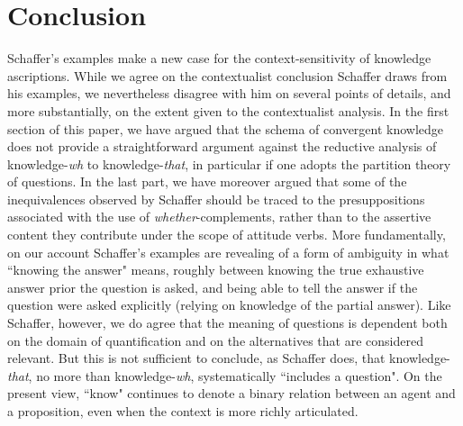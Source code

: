\section{Conclusion}

Schaffer's examples make a new case for the context-sensitivity of
knowledge ascriptions. While we agree on the contextualist
conclusion Schaffer draws from his examples, we nevertheless
disagree with him on several points of details, and more
substantially, on the extent given to the contextualist analysis.
In the first section of this paper, we have argued that the schema
of convergent knowledge does not provide a straightforward
argument against the reductive analysis of knowledge-\emph{wh} to
knowledge-\emph{that}, in particular if one adopts the partition
theory of questions. In the last part, we have moreover argued
that some of the inequivalences observed by Schaffer should be
traced to the presuppositions associated with the use of
\emph{whether}-complements, rather than to the assertive content
they contribute under the scope of attitude verbs. More
fundamentally, on our account Schaffer's examples are revealing of
a form of ambiguity in what ``knowing the answer" means, roughly
between knowing the true exhaustive answer prior the question is
asked, and being able to tell the answer if the question were
asked explicitly (relying on knowledge of the partial answer).
Like Schaffer, however, we do agree that the meaning of questions
is dependent both on the domain of quantification and on the
alternatives that are considered relevant. But this is not
sufficient to conclude, as Schaffer does, that
knowledge-\emph{that}, no more than knowledge-\emph{wh},
systematically ``includes a question". On the present view,
``know" continues to denote a binary relation between an agent and
a proposition, even when the context is more richly articulated.
